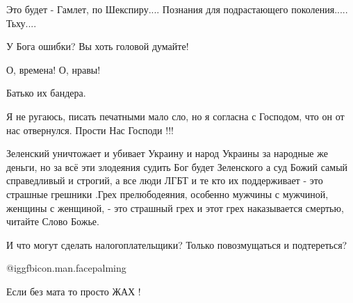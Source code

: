 \begin{itemize}
Это будет - Гамлет, по Шекспиру....
Познания для подрастающего поколения.....
Тьху....

У Бога ошибки? Вы хоть головой думайте!

О, времена! О, нравы!

Батько их бандера.

Я не ругаюсь, писать печатными мало сло, но я согласна с Господом, что он от нас отвернулся. Прости Нас Господи !!!


Зеленский уничтожает и убивает Украину и народ Украины за народные же деньги, но
за всё эти злодеяния судить Бог будет Зеленского а суд Божий самый справедливый
и строгий, а все люди ЛГБТ и те кто их поддерживает - это страшные грешники
.Грех прелюбодеяния, особенно мужчины с мужчиной, женщины с женщиной, - это
страшный грех и этот грех наказывается смертью, читайте Слово Божье.

И что могут сделать налогоплательщики? Только повозмущаться и подтереться?

 @igg{fbicon.man.facepalming} 

Если без мата то просто ЖАХ !

\end{itemize} %
